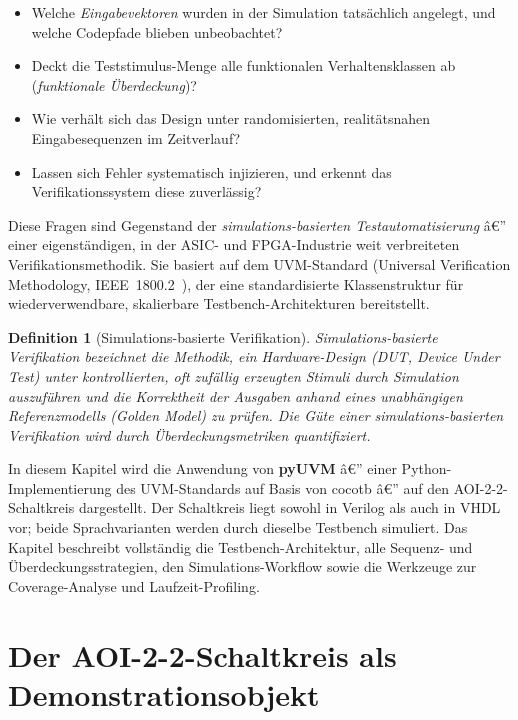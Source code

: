 ﻿\documentclass[12pt,a4paper]{report}
\newtheorem{definition}{Definition}[section]
\begin{document}
\begin{itemize}
    \item Welche \emph{Eingabevektoren} wurden in der Simulation tatsächlich
          angelegt, und welche Codepfade blieben unbeobachtet?
    \item Deckt die Teststimulus-Menge alle funktionalen Verhaltensklassen ab
          (\emph{funktionale Überdeckung})?
    \item Wie verhält sich das Design unter randomisierten, realitätsnahen
          Eingabesequenzen im Zeitverlauf?
    \item Lassen sich Fehler systematisch injizieren, und erkennt das
          Verifikationssystem diese zuverlässig?
\end{itemize}

Diese Fragen sind Gegenstand der \emph{simulations-basierten Testautomatisierung}
â€” einer eigenständigen, in der ASIC- und FPGA-Industrie weit verbreiteten
Verifikationsmethodik. Sie basiert auf dem UVM-Standard (Universal Verification
Methodology, IEEE~1800.2~\cite{uvm2020}), der eine standardisierte
Klassenstruktur für wiederverwendbare, skalierbare Testbench-Architekturen
bereitstellt.

\begin{definition}[Simulations-basierte Verifikation]
Simulations-basierte Verifikation bezeichnet die Methodik, ein
Hardware-Design (DUT, \emph{Device Under Test}) unter kontrollierten,
oft zufällig erzeugten Stimuli durch Simulation auszuführen und die
Korrektheit der Ausgaben anhand eines unabhängigen Referenzmodells (\emph{Golden
Model}) zu prüfen. Die Güte einer simulations-basierten Verifikation wird durch
\emph{Überdeckungsmetriken} quantifiziert.
\end{definition}

In diesem Kapitel wird die Anwendung von \textbf{pyUVM} \cite{pyuvm2024} â€” einer
Python-Implemen\-tierung des UVM-Standards auf Basis von cocotb \cite{cocotb2024}
â€” auf den AOI-2-2-Schaltkreis dargestellt. Der Schaltkreis liegt sowohl in
Verilog als auch in VHDL vor; beide Sprachvarianten werden durch dieselbe
Testbench simuliert. Das Kapitel beschreibt vollständig die
Testbench-Architektur, alle Sequenz- und Überdeckungsstrategien, den
Simulations-Workflow sowie die Werkzeuge zur Coverage-Analyse und
Laufzeit-Profiling.

\section{Der AOI-2-2-Schaltkreis als Demonstrationsobjekt}
\label{subsec:aoi_schaltkreis}
\end{document}
